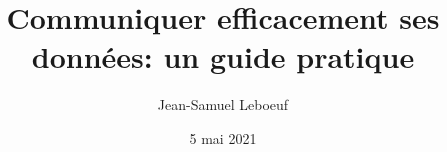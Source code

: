 \documentclass[aspectratio=169]{beamer}
\title{Communiquer efficacement ses données: un guide pratique}
\author[J.S. Leboeuf]{Jean-Samuel Leboeuf}
\date{5 mai 2021}
\begin{document}
\begin{frame}
\thispagestyle{empty}
\titlepage
\end{frame}


%







\end{document}
